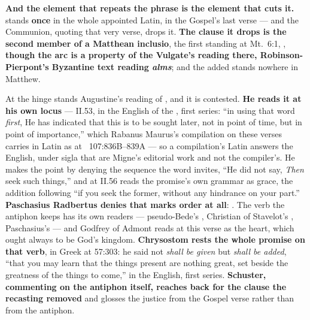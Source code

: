 \textbf{And the element that repeats the phrase is the element that cuts it.}
 stands \textbf{once} in the whole appointed Latin, in the
Gospel's last verse --- and the Communion, quoting that very verse, drops it.
\textbf{The clause it drops is the second member of a Matthean inclusio}, the
first standing at Mt.\ 6:1, , \textbf{though the arc is a property of the Vulgate's reading
there, Robinson-Pierpont's Byzantine text reading \emph{alms}}; and the added
 stands nowhere in Matthew.

At the hinge stands Augustine's reading of , and it is contested.
\textbf{He reads it at his own locus} --- 
II.53, in the English of the , first
series: ``in using that word \emph{first}, He has indicated that this is to be
sought later, not in point of time, but in point of importance,'' which
Rabanus Maurus's compilation on these verses carries in Latin as  at ~107:836B--839A --- so a
compilation's Latin answers the English, under sigla that are Migne's editorial
work and not the compiler's. He makes the point by denying the sequence the word
invites, ``He did not say, \emph{Then} seek such things,'' and at II.56 reads
the promise's own grammar as grace, the addition following ``if you seek the
former, without any hindrance on your part.'' \textbf{Paschasius
Radbertus denies that  marks order at all}: . The
verb the antiphon keeps has its own readers --- pseudo-Bede's , Christian of Stavelot's , Paschasius's  --- and Godfrey of Admont reads
 at this verse as the heart, which ought always to be God's
kingdom. \textbf{Chrysostom rests the whole promise on that verb}, in Greek at
 57:303: he said not \emph{shall be given} but
\emph{shall be added}, ``that you may learn that the things present are nothing
great, set beside the greatness of the things to come,'' in the  English, first series. \textbf{Schuster,
commenting on the antiphon itself, reaches back for the clause the recasting
removed} and glosses the justice from the Gospel verse rather than from the
antiphon.

